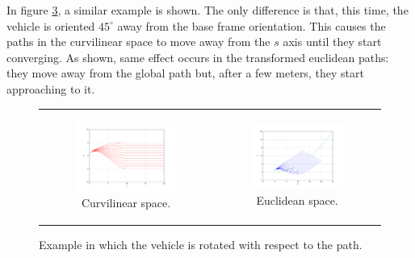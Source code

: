 In figure \ref{fig:cp07_frenet45}, a similar example is shown. The only difference is that, this time, the vehicle is oriented $45^\circ$ away from the base frame orientation. This causes the paths in the curvilinear space to move away from the $s$ axis until they start converging. As shown, same effect occurs in the transformed euclidean paths: they move away from the global path but, after a few meters, they start approaching to it.

\begin{figure}[h!]
\centering
\begin{tabular}{cc}
  \begin{subfigure}[b]{0.45\textwidth}
    \centering
    \includegraphics[width=\textwidth, trim=50 40 80 60,clip]{frenet45}
    \caption{Curvilinear space.}
    \label{fig:cp07_frenet_space45}
  \end{subfigure} &
  \begin{subfigure}[b]{0.45\textwidth}
    \centering
    \includegraphics[width=\textwidth, trim=50 40 80 60,clip]{cartesian45}
    \caption{Euclidean space.}
    \label{fig:cp07_cartesian45}
    \end{subfigure}
\end{tabular}
\caption{Example in which the vehicle is rotated with respect to the path.}\label{fig:cp07_frenet45}
\end{figure}

